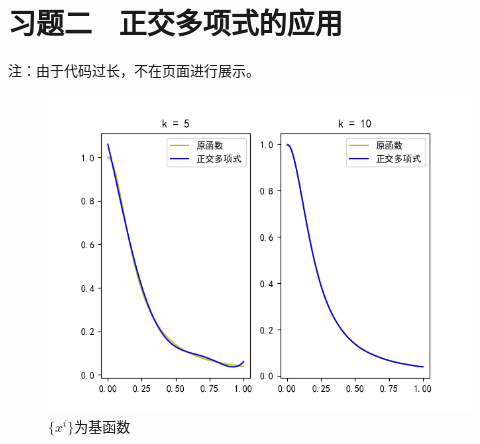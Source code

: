 \clearpage
\section{习题二 \ 正交多项式的应用}
注：由于代码过长，不在页面进行展示。
\begin{figure}[htbp]
    \centering

    {
        \begin{minipage}[b]{.9\linewidth}
            \centering
            \includegraphics[scale=0.6]{pic/2/1.png}
        \end{minipage}
    }


    \caption{$\{x^i\}$为基函数}

\end{figure}

